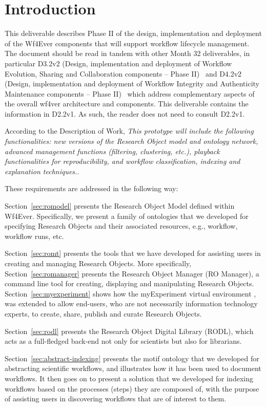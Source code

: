 \section{Introduction}

This deliverable describes Phase II of the design, implementation and
deployment of the Wf4Ever components that will support workflow
lifecycle management. The document should be read in tandem with other
Month 32 deliverables, in particular D3.2v2 (Design, implementation
and deployment of Workflow Evolution, Sharing and Collaboration
components -- Phase II)~\cite{D3.2v2} and D4.2v2 (Design,
implementation and deployment of Workflow Integrity and Authenticity
Maintenance components -- Phase II)~\cite{D4.2v2} which address
complementary aspects of the overall wf4ver architecture and
components. This deliverable contains the information in D2.2v1. As such, the reader does not need to consult D2.2v1.

According to the Description of Work, \emph{This prototype will include the following functionalities: new versions of the Research Object model and ontology network, advanced management functions (filtering, clustering, etc.), playback functionalities for reproducibility, and workflow classification, indexing and explanation techniques.}. 

These requirements are addressed in the following way:

Section~\ref{sec:romodel} presents the Research Object Model defined within Wf4Ever. Specifically, we present a family of ontologies that we developed for specifying Research Objects and their associated resources, e.g., workflow, workflow runs, etc. 

Section~\ref{sec:romt} presents the tools that we have developed for assisting users in creating and managing Research Objects. More specifically, Section~\ref{sec:romanager} presents the Research Object Manager (RO Manager), a command line tool for creating, displaying and manipulating Research Objects. Section~\ref{sec:myexperiment} shows how the myExperiment virtual environment \cite{DBLP:journals/fgcs/RoureGS09}, was extended to allow end-users, who are not necessarily information technology experts, to create, share, publish and curate Research Objects.

Section~\ref{sec:rodl} presents the Research Object Digital Library (RODL), which acts as a full-fledged back-end not only for scientists but also for librarians. 

Section~\ref{sec:abstract-indexing} presents the motif ontology that we developed for abstracting scientific workflows, and illustrates how it has been used to document workflows. It then goes on to present a solution that we developed for indexing workflows based on the processes (steps) they are composed of, with the purpose of assisting users in discovering workflows that are of interest to them. 
